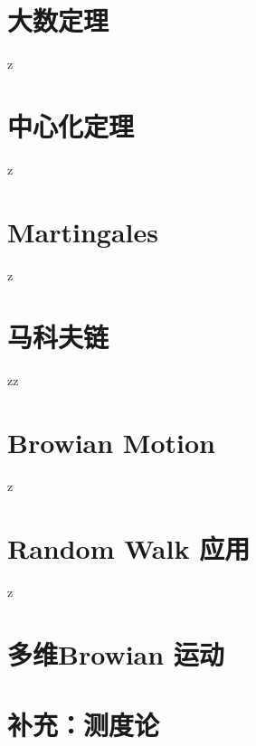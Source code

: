 \documentclass[lang=cn,newtx,11pt,scheme=chinese]{elegantbook}
\begin{document}
\chapter{大数定理}
z
\chapter{中心化定理}
z
\chapter{Martingales}
z
\chapter{马科夫链}
zz
\chapter{Browian Motion}
z
\chapter{Random Walk 应用}
z
\chapter{多维Browian 运动}

\chapter{补充：测度论}
\end{document}

